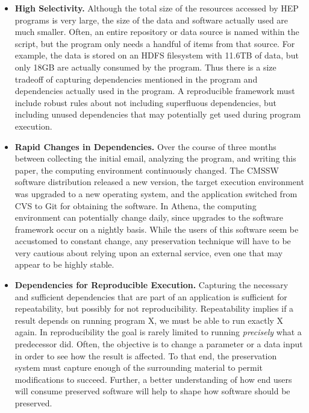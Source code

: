 \begin{itemize}
\item {\bf High Selectivity.}  
Although the total size of the resources accessed by HEP
programs is very large, the size of the data and software actually used are much smaller.
Often, an entire repository or data source is named within the script, but the program
only needs a handful of items from that source.  For example, the data is stored on an
HDFS filesystem with 11.6TB of data, but only 18GB are actually consumed by the program. 
Thus there is a size tradeoff of capturing dependencies mentioned in the program and dependencies actually used in the program.
A reproducible framework must include robust rules about not including superfluous dependencies, but including unused dependencies that may potentially get used during program execution.  

\item {\bf Rapid Changes in Dependencies.}  Over the course of three months
between collecting the initial email, analyzing the program, and writing this
paper, the computing environment continuously changed.  The CMSSW software
distribution released a new version, the target execution environment was upgraded
to a new operating system, and the application switched from CVS to Git for obtaining
the software. In Athena, the computing environment can potentially change daily, since upgrades to the software framework occur on a nightly basis.  
While the users of this software seem be accustomed to constant change,
any preservation technique will have to be very cautious about relying upon an
external service, even one that may appear to be highly stable.

\item {\bf Dependencies for Reproducible Execution.} Capturing the necessary and sufficient dependencies that are part of an application is sufficient for repeatability, but possibly for not reproducibility.
Repeatability implies if a result depends on running program X, we must be able to run exactly X again. In reproducibility the goal is rarely limited to running
\emph{precisely} what a predecessor did. Often, the objective is to
change a parameter or a data input in order to see how the result is affected. To that end, the preservation system must capture enough of the surrounding
material to permit modifications to succeed. 
Further, a better understanding of how end users will consume preserved software will help to shape how
software should be preserved.
\end{itemize}

